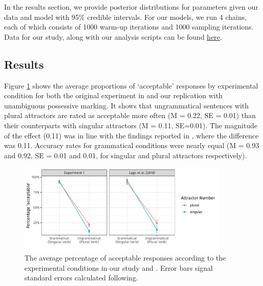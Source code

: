 \documentclass[times,linguex]{glossa}\usepackage[]{graphicx}\usepackage[]{color}
\newenvironment{knitrout}{}{} %
\begin{document}
In the results section, we provide posterior distributions for parameters given our data and model with 95\% credible intervals. For our models, we run 4 chains, each of which consists of 1000 warm-up iterations and 1000 sampling iterations. Data for our study, along with our analysis scripts can be found \href{https://anonymous.4open.science/r/replication_lagoetal2018-AC8C/}{here}.


\subsection{Results}

Figure \ref{fig:AverageResponses} shows the average proportions of `acceptable' responses by experimental condition for both the original experiment in \citet{LagoEtAl:2018} and our replication with unambiguous possessive marking. It shows that ungrammatical sentences with plural attractors are rated as acceptable more often (M = 0.22, SE = 0.01) than their counterparts with singular attractors (M = 0.11, SE=0.01). The magnitude of the effect (0.11) was in line with the findings reported in \citet{LagoEtAl:2018}, where the difference was 0.11. Accuracy rates for grammatical conditions were nearly equal (M = 0.93 and 0.92, SE = 0.01 and 0.01, for singular and plural attractors respectively).

\begin{figure}[hbt!]
\centering
\caption{The average percentage of acceptable responses according to the experimental conditions in our study and \citet{LagoEtAl:2018}. Error bars signal standard errors calculated following.}

\begin{knitrout}
\color{fgcolor}

{\centering \includegraphics[width=0.9\textwidth]{figure/AverageResponses-1} 

}


\end{knitrout}

\label{fig:AverageResponses}
\end{figure}
\end{document}
